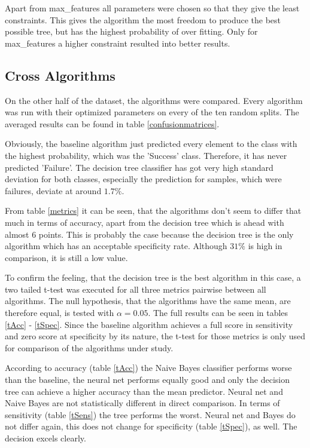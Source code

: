 \documentclass[a4paper,11pt]{article}
\begin{document}
Apart from max\_features all parameters were chosen so that they give the least constraints. This gives the algorithm the most freedom to produce the best possible tree, but has the highest probability of over fitting. Only for max\_features a higher constraint resulted into better results.

\subsection{Cross Algorithms}





On the other half of the dataset, the algorithms were compared. Every algorithm was run with their optimized parameters on every of the ten random splits. The averaged results can be found in table \ref{confusionmatrices}.

Obviously, the baseline algorithm just predicted every element to the class with the highest probability, which was the 'Success' class. Therefore, it has never predicted 'Failure'. The decision tree classifier has got very high standard deviation for both classes, especially the prediction for samples, which were failures, deviate at around $1.7\%$. 

From table \ref{metrics} it can be seen, that the algorithms don't seem to differ that much in terms of accuracy, apart from the decision tree which is ahead with almost $6$ points. This is probably the case because the decision tree is the only algorithm which has an acceptable specificity rate. Although $31\%$ is high in comparison, it is still a low value. 

To confirm the feeling, that the decision tree is the best algorithm in this case, a two tailed t-test was executed for all three metrics pairwise between all algorithms. The null hypothesis, that the algorithms have the same mean, are therefore equal, is tested with $\alpha = 0.05$. The full results can be seen in tables \ref{tAcc} - \ref{tSpec}.
Since the baseline algorithm achieves a full score in sensitivity and zero score at specificity by its nature, the t-test for those metrics is only used for comparison of the algorithms under study.

According to accuracy (table \ref{tAcc}) the Naive Bayes classifier performs worse than the baseline, the neural net performs equally good and only the decision tree can achieve a higher accuracy than the mean predictor. Neural net and Naive Bayes are not statistically different in direct comparison. 
In terms of sensitivity (table \ref{tSens}) the tree performs the worst. Neural net and Bayes do not differ again, this does not change for specificity (table \ref{tSpec}), as well. The decision excels clearly. 
\end{document}

